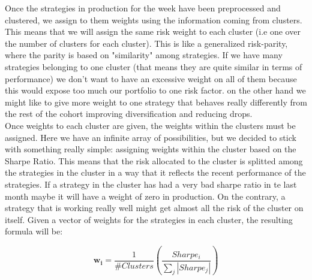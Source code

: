 Once the strategies in production for the week have been preprocessed and clustered, we assign to them weights using the information coming from clusters. This means that we will assign the same risk weight to each cluster (i.e one over the number of clusters for each cluster). This is like a generalized risk-parity, where the parity is based on "similarity" among strategies. If we have many strategies belonging to one cluster (that means they are quite similar in terms of performance) we don't want to have an excessive weight on all of them because this would expose too much our portfolio to one risk factor. on the other hand we might like to give more weight to one strategy that behaves really differently from the rest of the cohort improving diversification and reducing drops.\\
Once weights to each cluster are given, the weights within the clusters must be assigned. Here we have an infinite array of possibilities, but we decided to stick with something really simple: assigning weights within the cluster based on the Sharpe Ratio. This means that the risk allocated to the cluster is splitted among the strategies in the cluster in a way that it reflects the recent performance of the strategies. If a strategy in the cluster has had a very bad sharpe ratio in te last month maybe it will have a weight of zero in production. On the contrary, a strategy that is working really well might get almost all the risk of the cluster on itself. Given a vector of weights for the strategies in each cluster, the resulting formula will be: 

\begin{equation}\label{HRP_weights}
\mathbf{w_i} =  \frac{1}{\# Clusters}\left(\frac{Sharpe_i}{\sum_j |Sharpe_j|}\right)
\end{equation}